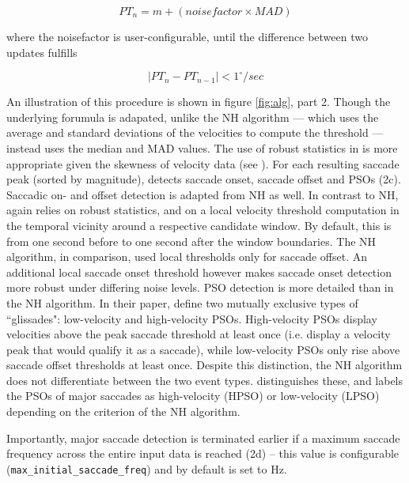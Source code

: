     $$PT_n = m + (noisefactor \times MAD)$$

    where the noisefactor is user-configurable, until the difference between two updates fulfills

    $$|PT_n - PT_{n-1}| < 1^\circ/sec$$

    An illustration of this procedure is shown in figure \ref{fig:alg}, part 2. Though the underlying forumula is
    adapated, unlike the NH algorithm --- which uses the average and standard deviations of the velocities to compute
    the threshold --- \remodnav instead uses the median and MAD values. The use of robust statistics in \remodnav is
    more appropriate given the skewness of velocity data (see \cite{Friedman2018}). For each resulting saccade peak
    (sorted by magnitude), \remodnav detects saccade onset, saccade offset and PSOs (2c). Saccadic on- and offset
    detection is adapted from NH as well. In contrast to NH, \remodnav again relies on robust statistics, and on a local
    velocity threshold computation in the temporal vicinity around a respective candidate window. By default, this is
    from one second before to one second after the window boundaries. The NH algorithm, in comparison, used local
    thresholds only for saccade offset. An additional local saccade onset threshold however makes saccade onset detection
    more robust under differing noise levels. 
    PSO detection is more detailed than in the NH algorithm. In their paper, \cite{Nystrom2010AnData} define two
    mutually exclusive types of ``glissades": low-velocity and high-velocity PSOs. High-velocity PSOs display velocities
    above the peak saccade threshold at least once (i.e. display a velocity peak that would qualify it as a saccade),
    while low-velocity PSOs only rise above saccade offset thresholds at least once. Despite this distinction, the NH
    algorithm does not differentiate between the two event types. \remodnav distinguishes these, and labels the PSOs of
    major saccades as high-velocity (HPSO) or low-velocity (LPSO) depending on the criterion of the NH algorithm.

    Importantly, major saccade detection is terminated earlier if a maximum saccade frequency across the entire input
    data is reached (2d) -- this value is configurable (\texttt{max\_initial\_saccade\_freq}) and by default is set to
    \unit[2]{Hz}.

